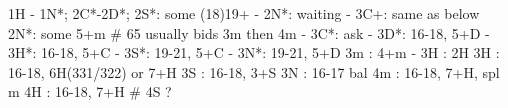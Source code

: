 1H - 1N*; 2C*-2D*; 
2S*: some (18)19+
   - 2N*: waiting
        - 3C+: same as below
2N*: some 5+m  # 65 usually bids 3m then 4m
   - 3C*: ask
        - 3D*: 16-18, 5+D
        - 3H*: 16-18, 5+C
        - 3S*: 19-21, 5+C
        - 3N*: 19-21, 5+D
3m : 4+m
   - 3H : 2H
3H : 16-18, 6H(331/322) or 7+H
3S : 16-18, 3+S
3N : 16-17 bal
4m : 16-18, 7+H, spl m
4H : 16-18, 7+H
# 4S ?